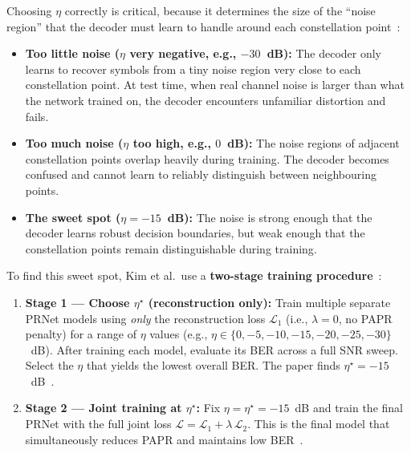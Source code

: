 Choosing $\eta$ correctly is critical, because it determines the size of the ``noise region'' that the decoder must learn to handle around each constellation point~\cite{kim2017novel}:

\begin{itemize}
    \item \textbf{Too little noise ($\eta$ very negative, e.g., $-30$~dB):} The decoder only learns to recover symbols from a tiny noise region very close to each constellation point.  At test time, when real channel noise is larger than what the network trained on, the decoder encounters unfamiliar distortion and fails.
    \item \textbf{Too much noise ($\eta$ too high, e.g., $0$~dB):} The noise regions of adjacent constellation points overlap heavily during training.  The decoder becomes confused and cannot learn to reliably distinguish between neighbouring points.
    \item \textbf{The sweet spot ($\eta = -15$~dB):} The noise is strong enough that the decoder learns robust decision boundaries, but weak enough that the constellation points remain distinguishable during training.
\end{itemize}

To find this sweet spot, Kim et al.\ use a \textbf{two-stage training procedure}~\cite{kim2017novel}:

\begin{enumerate}
    \item \textbf{Stage 1 --- Choose $\eta^\star$ (reconstruction only):} Train multiple separate PRNet models using \emph{only} the reconstruction loss $\mathcal{L}_1$ (i.e., $\lambda = 0$, no PAPR penalty) for a range of $\eta$ values (e.g., $\eta \in \{0, -5, -10, -15, -20, -25, -30\}$~dB). After training each model, evaluate its BER across a full SNR sweep. Select the $\eta$ that yields the lowest overall BER. The paper finds $\eta^\star = -15$~dB~\cite{kim2017novel}.

    \item \textbf{Stage 2 --- Joint training at $\eta^\star$:} Fix $\eta = \eta^\star = -15$~dB and train the final PRNet with the full joint loss $\mathcal{L} = \mathcal{L}_1 + \lambda\,\mathcal{L}_2$. This is the final model that simultaneously reduces PAPR and maintains low BER~\cite{kim2017novel}.
\end{enumerate}

